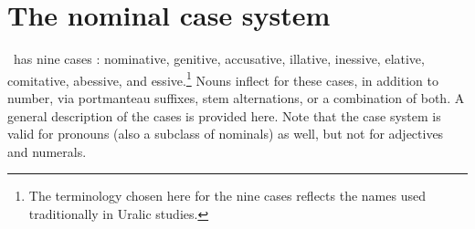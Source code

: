\section{The nominal case system}\label{case}
\PS\ has nine cases%
: nominative, genitive, accusative, illative, inessive, elative, comitative, abessive, and essive.\footnote{The terminology chosen here for the nine cases reflects the names used traditionally in Uralic studies.} 
Nouns inflect for these cases, in addition to number, via portmanteau suffixes, stem alternations, or a combination of both. %
A general description of the cases is provided here. %
Note that the case system is valid for pronouns (also a subclass of nominals) as well, but not for adjectives and numerals. %

